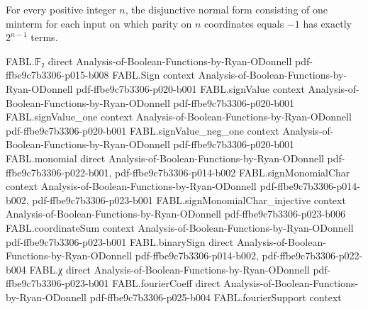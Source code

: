 \begin{theorem}
\label{FABL.size_parityDNF}
\leanok
{}
For every positive integer $n$, the disjunctive normal form consisting of one minterm
for each input on which parity on $n$ coordinates equals $-1$ has exactly $2^{n-1}$
terms.
\end{theorem}

\begin{theorem}
\label{FABL.DNFsize_parityFunction_univ}
\leanok
{}
\proofstep
  {FABL.𝔽₂}
  {direct}
  {Analysis-of-Boolean-Functions-by-Ryan-ODonnell}
  {pdf-ffbe9c7b3306-p015-b008}
\proofstep
  {FABL.Sign}
  {context}
  {Analysis-of-Boolean-Functions-by-Ryan-ODonnell}
  {pdf-ffbe9c7b3306-p020-b001}
\proofstep
  {FABL.signValue}
  {context}
  {Analysis-of-Boolean-Functions-by-Ryan-ODonnell}
  {pdf-ffbe9c7b3306-p020-b001}
\proofstep
  {FABL.signValue_one}
  {context}
  {Analysis-of-Boolean-Functions-by-Ryan-ODonnell}
  {pdf-ffbe9c7b3306-p020-b001}
\proofstep
  {FABL.signValue_neg_one}
  {context}
  {Analysis-of-Boolean-Functions-by-Ryan-ODonnell}
  {pdf-ffbe9c7b3306-p020-b001}
\proofstep
  {FABL.monomial}
  {direct}
  {Analysis-of-Boolean-Functions-by-Ryan-ODonnell}
  {pdf-ffbe9c7b3306-p022-b001,
    pdf-ffbe9c7b3306-p014-b002}
\proofstep
  {FABL.signMonomialChar}
  {context}
  {Analysis-of-Boolean-Functions-by-Ryan-ODonnell}
  {pdf-ffbe9c7b3306-p014-b002,
    pdf-ffbe9c7b3306-p023-b001}
\proofstep
  {FABL.signMonomialChar_injective}
  {context}
  {Analysis-of-Boolean-Functions-by-Ryan-ODonnell}
  {pdf-ffbe9c7b3306-p023-b006}
\proofstep
  {FABL.coordinateSum}
  {context}
  {Analysis-of-Boolean-Functions-by-Ryan-ODonnell}
  {pdf-ffbe9c7b3306-p023-b001}
\proofstep
  {FABL.binarySign}
  {direct}
  {Analysis-of-Boolean-Functions-by-Ryan-ODonnell}
  {pdf-ffbe9c7b3306-p014-b002,
    pdf-ffbe9c7b3306-p022-b004}
\proofstep
  {FABL.χ}
  {direct}
  {Analysis-of-Boolean-Functions-by-Ryan-ODonnell}
  {pdf-ffbe9c7b3306-p023-b001}
\proofstep
  {FABL.fourierCoeff}
  {direct}
  {Analysis-of-Boolean-Functions-by-Ryan-ODonnell}
  {pdf-ffbe9c7b3306-p025-b004}
\proofstep
  {FABL.fourierSupport}
  {context}

\end{theorem}
